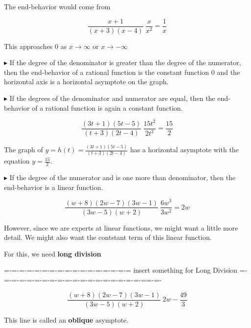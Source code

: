 \documentclass{ximera}
\begin{document}
The end-behavior would come from 


\[ \frac{x+1}{(x+3)(x-4)}    ~    \frac{x}{x^2} = \frac{1}{x}  \]


This approaches $0$ as $x \to \infty$ or $x \to -\infty$ 


$\blacktriangleright$   If the degree of the denominator is greater than the degree of the numerator, then the end-behavior of a rational function is the constant function $0$ and the horizontal axis is a horizontal asymptote on the graph.




$\blacktriangleright$   If the degrees of the denominator and numerator are equal, then the end-behavior of a rational function is again a constant function.


\[ \frac{(3t+1)(5t-5)}{(t+3)(2t-4)}    ~    \frac{15t^2}{2t^2} = \frac{15}{2}  \]




The graph of $y = h(t) = \frac{(3t+1)(5t-5)}{(t+3)(2t-4)} $ has a horizontal asymptote with the equation $y = \frac{15}{2}$.




$\blacktriangleright$   If the degree of the numerator and is one more than denominator, then the end-behavior is a linear function.


\[ \frac{(w+8)(2w-7)(3w-1)}{(3w-5)(w+2)}    ~    \frac{6w^3}{3w^2} = 2w  \]
















\begin{center}
\end{center}







\begin{center}
\end{center}



However, since we are experts at linear functions, we might want a little more detail.  We might also want the contstant term of this linear function.  

For this, we need \textbf{long division}





=-=-=-=-=-=-=-=-=-=-=-=-=-=-=-=-=  insert something for Long Division =-=-=-=-=-=-=-=-=-=-=-=-=-=-=-=-=-=-=-==-=-



\[ \frac{(w+8)(2w-7)(3w-1)}{(3w-5)(w+2)}    ~     2w -\frac{49}{3}  \]



\begin{center}
\end{center}


This line is called an \textbf{oblique} asymptote.
\end{document}

